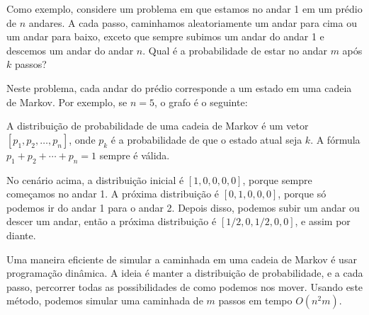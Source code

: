 Como exemplo, considere um problema
em que estamos no andar 1 em um prédio de $n$ andares.
A cada passo, caminhamos aleatoriamente um andar
para cima ou um andar para baixo, exceto que sempre
subimos um andar do andar 1 e descemos um andar
do andar $n$.
Qual é a probabilidade de estar no andar $m$
após $k$ passos?

Neste problema, cada andar do prédio
corresponde a um estado em uma cadeia de Markov.
Por exemplo, se $n=5$, o grafo é o seguinte:

\begin{center}
\end{center}

A distribuição de probabilidade
de uma cadeia de Markov é um vetor
$[p_1,p_2,\ldots,p_n]$, onde $p_k$ é a
probabilidade de que o estado atual seja $k$.
A fórmula $p_1+p_2+\cdots+p_n=1$ sempre é válida.

No cenário acima, a distribuição inicial é
$[1,0,0,0,0]$, porque sempre começamos no andar 1.
A próxima distribuição é $[0,1,0,0,0]$,
porque só podemos ir do andar 1 para o andar 2.
Depois disso, podemos subir um andar
ou descer um andar, então a próxima distribuição é
$[1/2,0,1/2,0,0]$, e assim por diante.

Uma maneira eficiente de simular a caminhada em
uma cadeia de Markov é usar programação dinâmica.
A ideia é manter a distribuição de probabilidade,
e a cada passo, percorrer todas as possibilidades
de como podemos nos mover.
Usando este método, podemos simular
uma caminhada de $m$ passos em tempo $O(n^2 m)$.

